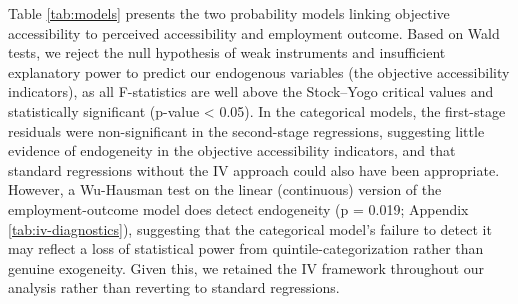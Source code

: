 \documentclass[preprint, 3p,
authoryear]{elsarticle} %
\begin{document}
Table \ref{tab:models} presents the two probability models linking
objective accessibility to perceived accessibility and employment
outcome. Based on Wald tests, we reject the null hypothesis of weak
instruments and insufficient explanatory power to predict our endogenous
variables (the objective accessibility indicators), as all F-statistics
are well above the Stock--Yogo critical values and statistically
significant (p-value \textless{} 0.05). In the categorical models, the
first-stage residuals were non-significant in the second-stage
regressions, suggesting little evidence of endogeneity in the objective
accessibility indicators, and that standard regressions without the IV
approach could also have been appropriate. However, a Wu-Hausman test on
the linear (continuous) version of the employment-outcome model does
detect endogeneity (p = 0.019; Appendix \ref{tab:iv-diagnostics}),
suggesting that the categorical model's failure to detect it may reflect
a loss of statistical power from quintile-categorization rather than
genuine exogeneity. Given this, we retained the IV framework throughout
our analysis rather than reverting to standard regressions.
\end{document}
